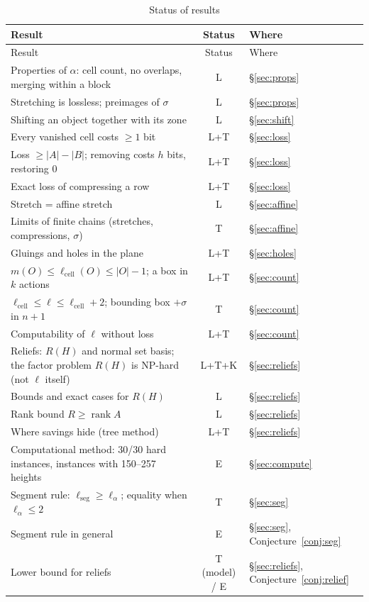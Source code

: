 \documentclass[11pt,a4paper]{article}
\theoremstyle{plain}
\theoremstyle{definition}
\theoremstyle{remark}
\newcommand{\lc}{\ell_{\mathrm{cell}}}
\newcommand{\lseg}{\ell_{\mathrm{seg}}}
\begin{document}
\begin{longtable}{p{}cp{}}
\caption{Status of results}\label{tab:status}\\
\toprule
Result & Status & Where\\
\midrule
\endfirsthead
\toprule Result & Status & Where\\ \midrule \endhead
Properties of $\alpha$: cell count, no overlaps, merging within a block & L & §\ref{sec:props}\\
Stretching is lossless; preimages of $\sigma$ & L & §\ref{sec:props}\\
Shifting an object together with its zone & L & §\ref{sec:shift}\\
Every vanished cell costs $\ge1$ bit & L+T & §\ref{sec:loss}\\
Loss $\ge|A|-|B|$; removing costs $h$ bits, restoring 0 & L+T & §\ref{sec:loss}\\
Exact loss of compressing a row & L+T & §\ref{sec:loss}\\
Stretch = affine stretch & L & §\ref{sec:affine}\\
Limits of finite chains (stretches, compressions, $\sigma$) & T & §\ref{sec:affine}\\
Gluings and holes in the plane & L+T & §\ref{sec:holes}\\
$m(O)\le\lc(O)\le|O|-1$; a box in $k$ actions & L+T & §\ref{sec:count}\\
$\lc\le\ell\le\lc+2$; bounding box $+\sigma$ in $n+1$ & T & §\ref{sec:count}\\
Computability of $\ell$ without loss & L+T & §\ref{sec:count}\\
Reliefs: $R(H)$ and normal set basis; the factor problem $R(H)$ is NP-hard (not $\ell$ itself) & L+T+K & §\ref{sec:reliefs}\\
Bounds and exact cases for $R(H)$ & L & §\ref{sec:reliefs}\\
Rank bound $R\ge\operatorname{rank}A$ & L & §\ref{sec:reliefs}\\
Where savings hide (tree method) & L+T & §\ref{sec:reliefs}\\
Computational method: 30/30 hard instances, instances with 150--257 heights & E & §\ref{sec:compute}\\
Segment rule: $\lseg\ge\ell_\alpha$; equality when $\ell_\alpha\le2$ & T & §\ref{sec:seg}\\
Segment rule in general & E & §\ref{sec:seg}, Conjecture~\ref{conj:seg}\\
Lower bound for reliefs & T (model) / E & §\ref{sec:reliefs}, Conjecture~\ref{conj:relief}\\
\bottomrule
\end{longtable}
\end{document}
